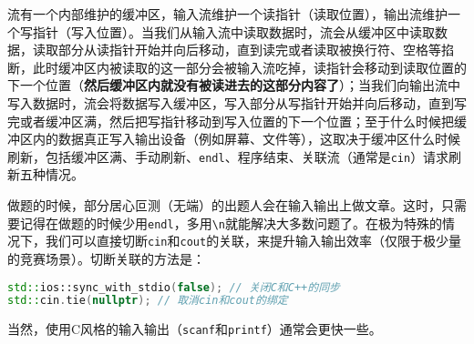 \documentclass[../main.tex]{subfiles}
\begin{document}
流有一个内部维护的缓冲区，输入流维护一个读指针（读取位置），输出流维护一个写指针（写入位置）。当我们从输入流中读取数据时，流会从缓冲区中读取数据，读取部分从读指针开始并向后移动，直到读完或者读取被换行符、空格等掐断，此时缓冲区内被读取的这一部分会被输入流吃掉，读指针会移动到读取位置的下一个位置（\textbf{然后缓冲区内就没有被读进去的这部分内容了}）；当我们向输出流中写入数据时，流会将数据写入缓冲区，写入部分从写指针开始并向后移动，直到写完或者缓冲区满，然后把写指针移动到写入位置的下一个位置；至于什么时候把缓冲区内的数据真正写入输出设备（例如屏幕、文件等），这取决于缓冲区什么时候刷新，包括缓冲区满、手动刷新、\texttt{endl}、程序结束、关联流（通常是\texttt{cin}）请求刷新五种情况。

做题的时候，部分居心叵测（无端）的出题人会在输入输出上做文章。这时，只需要记得在做题的时候少用\texttt{endl}，多用\texttt{\textbackslash n}就能解决大多数问题了。在极为特殊的情况下，我们可以直接切断\texttt{cin}和\texttt{cout}的关联，来提升输入输出效率（仅限于极少量的竞赛场景）。切断关联的方法是：
\begin{lstlisting}[language=C++]
std::ios::sync_with_stdio(false); // 关闭C和C++的同步
std::cin.tie(nullptr); // 取消cin和cout的绑定
\end{lstlisting}
当然，使用C风格的输入输出（\texttt{scanf}和\texttt{printf}）通常会更快一些。
\end{document}
